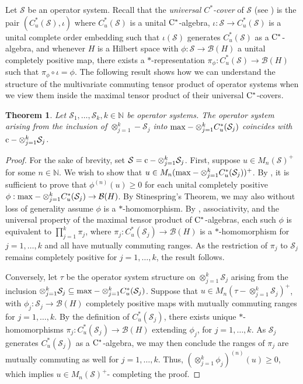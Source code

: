 \documentclass[11pt]{amsart}
\newtheorem{theorem}{Theorem}[section]
\newcommand{\cl}[1]{\mathcal{#1}}
\newcommand{\bb}[1]{\mathbb{#1}}
\begin{document}
Let $\cl{S}$ be an operator system. Recall that the \textit{universal $C^{*}$-cover} of $\cl{S}$ (see \cite{kw}) is the pair $(C_{u}^{*}(\cl{S}), \iota)$ where $C_{u}^{*}(\cl{S})$ is a unital ${\rm C}^{*}$-algebra, $\iota: \cl{S}\rightarrow C_{u}^{*}(\cl{S})$ is a unital complete order embedding such that $\iota(\cl{S})$ generates $C_{u}^{*}(\cl{S})$ as a ${\rm C}^{*}$-algebra, and whenever $H$ is a Hilbert space with $\phi: \cl{S}\rightarrow \cl{B}(H)$ a unital completely positive map, there exists a $*$-representation $\pi_{\phi}: C_{u}^{*}(\cl{S})\rightarrow \cl{B}(H)$ such that $\pi_{\phi} \circ \iota = \phi$. The following result shows how we can understand the structure of the multivariate commuting tensor product of operator systems when we view them inside the maximal tensor product of their universal ${\rm C}^{*}$-covers. 

\begin{theorem}\label{op_sys_incl_to_env}
Let $\cl{S}_{1}, \hdots, \cl{S}_{k}, k \in \bb{N}$ be operator systems. The operator system arising from the inclusion of $\otimes_{j=1}^{k}-\cl{S}_{j}$ into ${\rm max}-\otimes_{j=1}^{k}C_{u}^{*}(\cl{S}_{j})$ coincides with ${\rm c}-\otimes_{j=1}^{k}\cl{S}_{j}$. 
\end{theorem}
\begin{proof}

For the sake of brevity, set $\cl{S} = {\rm c}-\otimes_{j=1}^{k}\cl{S}_{j}$. First, suppose $u \in M_{n}(\cl{S})^{+}$ for some $n \in \bb{N}$. We wish to show that $u \in M_{n}({\rm max}-\otimes_{j=1}^{k}C_{u}^{*}(\cl{S}_{j}))^{+}$. By \cite[Lemma 4.1]{kptt}, it is sufficient to prove that $\phi^{(n)}(u) \geq 0$ for each unital completely positive $\phi: {\rm max}-\otimes_{j=1}^{k}C_{u}^{*}(\cl{S}_{j})\rightarrow \cl{B}(H)$. By Stinespring's Theorem, we may also without loss of generality assume $\phi$ is a $*$-homomorphism. By \cite[Proposition 7.4]{gt_one}, associativity, and the universal property of the maximal tensor product of ${\rm C}^{*}$-algebras, each such $\phi$ is equivalent to $\prod_{j=1}^{k}\pi_{j}$, where $\pi_{j}: C_{u}^{*}(\cl{S}_{j})\rightarrow \cl{B}(H)$ is a $*$-homomorphism for $j = 1, \hdots, k$ and all have mutually commuting ranges. As the restriction of $\pi_{j}$ to $\cl{S}_{j}$ remains completely positive for $j = 1, \hdots, k$, the result follows. 

Conversely, let $\tau$ be the operator system structure on $\otimes_{j=1}^{k}\cl{S}_{j}$ arising from the inclusion $\otimes_{j=1}^{k}\cl{S}_{j} \subseteq {\rm max}-\otimes_{j=1}^{k}C_{u}^{*}(\cl{S}_{j})$. Suppose that $u \in M_{n}(\tau-\otimes_{j=1}^{k}\cl{S}_{j})^{+}$, with $\phi_{j}: \cl{S}_{j}\rightarrow \cl{B}(H)$ completely positive maps with mutually commuting ranges for $j = 1, \hdots, k$. By the definition of $C_{u}^{*}(\cl{S}_{j})$, there exists unique $*$-homomorphisms $\pi_{j}: C_{u}^{*}(\cl{S}_{j})\rightarrow \cl{B}(H)$ extending $\phi_{j}$, for $j = 1, \hdots, k$. As $\cl{S}_{j}$ generates $C_{u}^{*}(\cl{S}_{j})$ as a ${\rm C}^{*}$-algebra, we may then conclude the ranges of $\pi_{j}$ are mutually commuting as well for $j = 1, \hdots, k$. Thus, $(\otimes_{j=1}^{k}\phi_{j})^{(n)}(u) \geq 0$, which implies $u \in M_{n}(\cl{S})^{+}$- completing the proof.
\end{proof}
\end{document}
